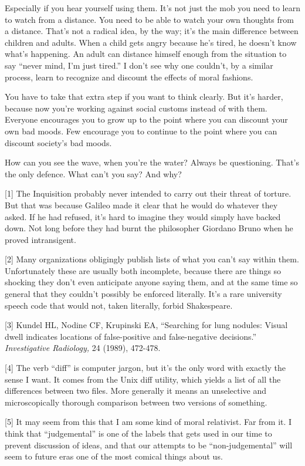 Especially if you hear yourself using them. It's not just the mob you
need to learn to watch from a distance. You need to be able to watch
your own thoughts from a distance. That's not a radical idea, by the
way; it's the main difference between children and adults. When a child
gets angry because he's tired, he doesn't know what's happening. An
adult can distance himself enough from the situation to say ``never
mind, I'm just tired.'' I don't see why one couldn't, by a similar
process, learn to recognize and discount the effects of moral fashions.

You have to take that extra step if you want to think clearly. But it's
harder, because now you're working against social customs instead of
with them. Everyone encourages you to grow up to the point where you can
discount your own bad moods. Few encourage you to continue to the point
where you can discount society's bad moods.

How can you see the wave, when you're the water? Always be questioning.
That's the only defence. What can't you say? And why?

{[}1{]} The Inquisition probably never intended to carry out their
threat of torture. But that was because Galileo made it clear that he
would do whatever they asked. If he had refused, it's hard to imagine
they would simply have backed down. Not long before they had burnt the
philosopher Giordano Bruno when he proved intransigent.

{[}2{]} Many organizations obligingly publish lists of what you can't
say within them. Unfortunately these are usually both incomplete,
because there are things so shocking they don't even anticipate anyone
saying them, and at the same time so general that they couldn't possibly
be enforced literally. It's a rare university speech code that would
not, taken literally, forbid Shakespeare.

{[}3{]} Kundel HL, Nodine CF, Krupinski EA, ``Searching for lung
nodules: Visual dwell indicates locations of false-positive and
false-negative decisions.'' \emph{Investigative Radiology,} 24 (1989),
472-478.

{[}4{]} The verb ``diff'' is computer jargon, but it's the only word
with exactly the sense I want. It comes from the Unix diff utility,
which yields a list of all the differences between two files. More
generally it means an unselective and microscopically thorough
comparison between two versions of something.

{[}5{]} It may seem from this that I am some kind of moral relativist.
Far from it. I think that ``judgemental'' is one of the labels that gets
used in our time to prevent discussion of ideas, and that our attempts
to be ``non-judgemental'' will seem to future eras one of the most
comical things about us.

